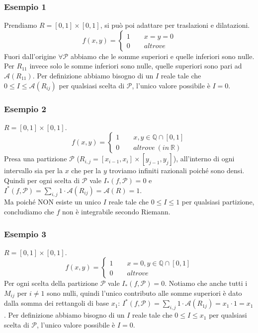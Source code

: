 \documentclass[10pt]{article}
\theoremstyle{plain}
\theoremstyle{definition}
\begin{document}
\subsubsection{Esempio 1}
Prendiamo $R=[0,1]\times [0,1]$, si può poi adattare per traslazioni e dilatazioni.
\begin{equation}
  f(x,y)=
   \begin{cases}
   1\qquad x=y=0\\0 \qquad altrove
   \end{cases}
\end{equation}
Fuori dall'origine $\forall \mathcal{P}$ abbiamo che le somme superiori e quelle inferiori sono nulle. Per $R_{11}$ invece solo le somme inferiori sono nulle, quelle superiori sono pari ad $\mathcal{A}(R_{11})$. Per definizione abbiamo bisogno di un $I$ reale tale che $0\leq I\leq \mathcal{A}(R_{ij})$ per qualsiasi scelta di $\mathcal{P}$, l'unico valore possibile è $I=0$.


\subsubsection{Esempio 2} \label{notint}
$R=[0,1]\times [0,1]$.
\begin{equation}
  f(x,y)=
   \begin{cases}
   1\qquad x,y \in \mathbb{Q}\cap [0,1]\\0 \qquad altrove\ (in\ \mathbb{R})
   \end{cases}
\end{equation}
Presa una  partizione $\mathcal{P}$ ($R_{i,j}=[x_{i-1},x_i]\times [y_{j-1},y_j]$), all'interno di ogni intervallo sia per la $x$ che per la $y$ troviamo infiniti razionali poiché sono densi. Quindi per ogni scelta di $\mathcal{P}$ vale $I_*(f,\mathcal{P})=0$ e $I^*(f,\mathcal{P})=\sum_{i,j}1\cdot \mathcal{A}(R_{ij})= \mathcal{A}(R)=1$.
\\ Ma poiché NON esiste un unico $I$ reale tale che $0\leq I\leq1$ per qualsiasi partizione, concludiamo che $f$ non è integrabile secondo Riemann.

\subsubsection{Esempio 3}
$R=[0,1]\times [0,1]$.
\begin{equation}
  f(x,y)=
   \begin{cases}
   1\qquad x=0, y \in \mathbb{Q}\cap [0,1]\\0 \qquad altrove
   \end{cases}
\end{equation}
Per ogni scelta della partizione $\mathcal{P}$ vale $I_*(f,\mathcal{P})=0$. Notiamo che anche tutti i $M_{ij}$ per $i\neq 1$ sono nulli, quindi l'unico contributo alle somme superiori è dato dalla somma dei rettangoli di base $x_1$: $I^*(f,\mathcal{P})=\sum_{i,j}1\cdot \mathcal{A}(R_{1j})= x_1\cdot 1=x_1$.
 Per definizione abbiamo bisogno di un $I$ reale tale che $0\leq I\leq x_1$ per qualsiasi scelta di $\mathcal{P}$, l'unico valore possibile è $I=0$.
 
\end{document}
